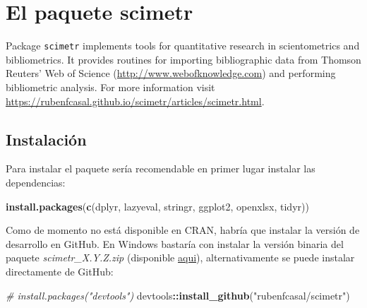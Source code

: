 \documentclass[
]{book}
\newenvironment{Shaded}{\begin{snugshade}}{\end{snugshade}}
\newcommand{\CommentTok}[1]{\textcolor[rgb]{0.56,0.35,0.01}{\textit{#1}}}
\newcommand{\FunctionTok}[1]{\textcolor[rgb]{0.13,0.29,0.53}{\textbf{#1}}}
\newcommand{\NormalTok}[1]{#1}
\newcommand{\SpecialCharTok}[1]{\textcolor[rgb]{0.81,0.36,0.00}{\textbf{#1}}}
\newcommand{\StringTok}[1]{\textcolor[rgb]{0.31,0.60,0.02}{#1}}
\begin{document}
\hypertarget{scimetr}{%
\chapter{El paquete scimetr}\label{scimetr}}

Package \texttt{scimetr} implements tools for quantitative research in scientometrics and bibliometrics.
It provides routines for importing bibliographic data from Thomson Reuters' Web of Science (\url{http://www.webofknowledge.com}) and performing bibliometric analysis. For more information visit \url{https://rubenfcasal.github.io/scimetr/articles/scimetr.html}.

\hypertarget{instalaciuxf3n}{%
\section{Instalación}\label{instalaciuxf3n}}

Para instalar el paquete sería recomendable en primer lugar instalar las dependencias:

\begin{Shaded}
\begin{Highlighting}[]
\FunctionTok{install.packages}\NormalTok{(}\FunctionTok{c}\NormalTok{(}\StringTok{\textquotesingle{}dplyr\textquotesingle{}}\NormalTok{, }\StringTok{\textquotesingle{}lazyeval\textquotesingle{}}\NormalTok{, }\StringTok{\textquotesingle{}stringr\textquotesingle{}}\NormalTok{, }\StringTok{\textquotesingle{}ggplot2\textquotesingle{}}\NormalTok{, }\StringTok{\textquotesingle{}openxlsx\textquotesingle{}}\NormalTok{, }\StringTok{\textquotesingle{}tidyr\textquotesingle{}}\NormalTok{))}
\end{Highlighting}
\end{Shaded}

Como de momento no está disponible en CRAN,
habría que instalar la versión de desarrollo en GitHub.
En Windows bastaría con instalar la versión binaria del paquete \emph{scimetr\_X.Y.Z.zip}
(disponible \href{https://github.com/rubenfcasal/scimetr/tree/master/docs}{aqui}),
alternativamente se puede instalar directamente de GitHub:

\begin{Shaded}
\begin{Highlighting}[]
\CommentTok{\# install.packages("devtools")}
\NormalTok{devtools}\SpecialCharTok{::}\FunctionTok{install\_github}\NormalTok{(}\StringTok{"rubenfcasal/scimetr"}\NormalTok{)}
\end{Highlighting}
\end{Shaded}
\end{document}
